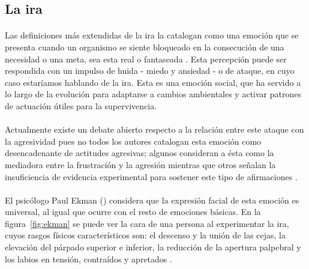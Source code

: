 
\subsection{La ira}

\paragraph{}
Las definiciones más extendidas de la ira la catalogan como una emoción que se presenta cuando un organismo se siente bloqueado en la consecución de una necesidad o una meta, sea esta real o fantaseada \citep{nieto2008aproximaciones}. Esta percepción puede ser respondida con un impulso de huida - miedo y ansiedad - o de ataque, en cuyo caso estaríamos hablando de la ira. Esta es una emoción social, que ha servido a lo largo de la evolución para adaptarse a cambios ambientales y activar patrones de actuación útiles para la supervivencia.

\paragraph{}
Actualmente existe un debate abierto respecto a la relación entre este ataque con la agresividad pues no todos los autores catalogan esta emoción como desencadenante de actitudes agresivas; algunos consideran a ésta como la mediadora entre la frustración y la agresión \citep{averill1983studies} mientras que otros señalan la insuficiencia de evidencia experimental para sostener este tipo de afirmaciones \citep{berkowitz1989frustration}.

\paragraph{}
El psicólogo Paul Ekman (\citeyear{ekman1997face}) considera que la expresión facial de esta emoción es universal, al igual que ocurre con el resto de emociones básicas. En la figura~\ref{fig:ekman} se puede ver la cara de una persona al experimentar la ira, cuyos rasgos físicos característicos son: el descenso y la unión de las cejas, la elevación del párpado superior e inferior, la reducción de la apertura palpebral y los labios en tensión, contraídos y apretados \citep{lairama}.


